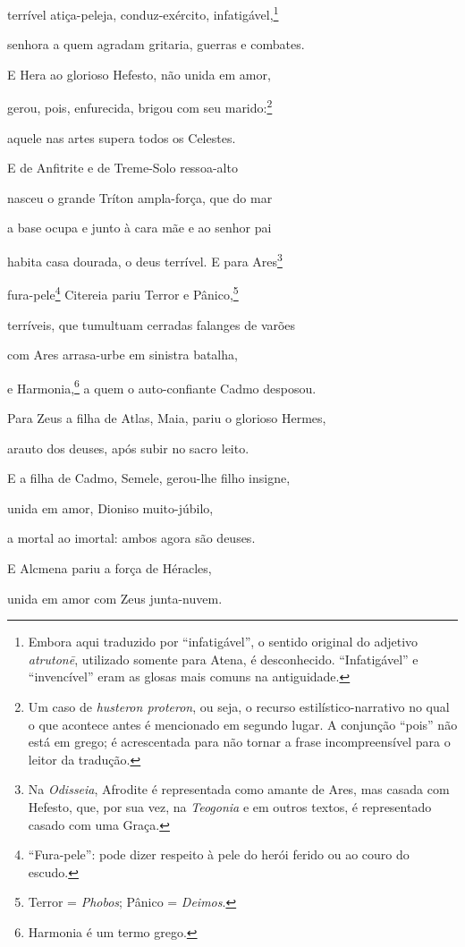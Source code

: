 \begin{pages}
\begin{Rightside}
terrível atiça-peleja, conduz-exército, infatigável,\footnote{Embora aqui traduzido por ``infatigável'', o sentido original do
adjetivo \emph{atrutonē}, utilizado somente para Atena, é desconhecido.
``Infatigável'' e ``invencível'' eram as glosas mais comuns na
antiguidade.} 

senhora a quem agradam gritaria, guerras e combates.

E Hera ao glorioso Hefesto, não unida em amor,

gerou, pois, enfurecida, brigou com seu marido:\footnote{Um caso de \emph{husteron proteron}, ou seja, o recurso
estilístico-narrativo no qual o que acontece antes é mencionado em
segundo lugar. A conjunção ``pois'' não está em grego; é acrescentada
para não tornar a frase incompreensível para o leitor da tradução.}

aquele nas artes supera todos os Celestes.

\quad{}E de Anfitrite e de Treme-Solo ressoa-alto 

nasceu o grande Tríton ampla-força, que do mar

a base ocupa e junto à cara mãe e ao senhor pai

habita casa dourada, o deus terrível. E para Ares\footnote{Na \emph{Odisseia}, Afrodite é representada como amante de Ares, mas casada com Hefesto, que, por sua vez, na \emph{Teogonia} e em outros textos, é representado casado com uma Graça.}

fura-pele\footnote{``Fura-pele'': pode dizer respeito à pele do herói ferido ou ao
couro do escudo.} Citereia pariu Terror e Pânico,\footnote{Terror = \emph{Phobos}; Pânico = \emph{Deimos}.}

terríveis, que tumultuam cerradas falanges de varões 

com Ares arrasa-urbe em sinistra batalha,

e Harmonia,\footnote{Harmonia é um termo grego.} a quem o auto-confiante Cadmo desposou.

\quad{}Para Zeus a filha de Atlas, Maia, pariu o glorioso Hermes,

arauto dos deuses, após subir no sacro leito.

\quad{}E a filha de Cadmo, Semele, gerou-lhe filho insigne, 

unida em amor, Dioniso muito-júbilo,

a mortal ao imortal: ambos agora são deuses.

\quad{}E Alcmena pariu a força de Héracles,

unida em amor com Zeus junta-nuvem.


\end{Rightside}
\end{pages}

